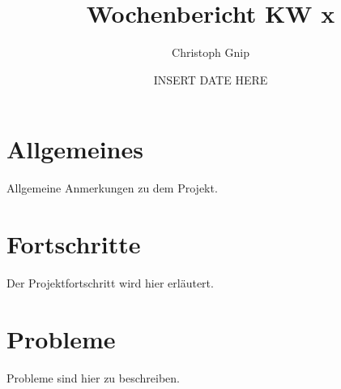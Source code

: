 ﻿\documentclass[a4paper,12pt,fleqn]{scrartcl}
\title{Wochenbericht KW x}
\author{Christoph Gnip}
\date{ INSERT DATE HERE }
\begin{document}
\maketitle

\section[Allgemeines]{Allgemeines}

Allgemeine Anmerkungen zu dem Projekt.

\section[Fortschritte]{Fortschritte}

Der Projektfortschritt wird hier erläutert.

\section[Probleme]{Probleme}

Probleme sind hier zu beschreiben.
\end{document}
